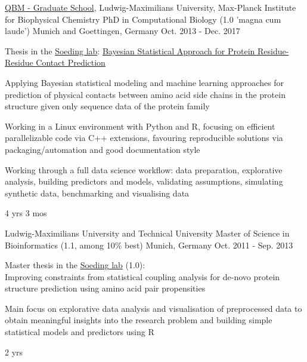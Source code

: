 

\begin{cventries}

  \cventrynew
  	{\href{http://www.qbm.genzentrum.lmu.de/}{QBM - Graduate School}, Ludwig-Maximilians University, Max-Planck Institute for Biophysical Chemistry}
  	{PhD in Computational Biology (1.0 'magna cum laude')} 
	{Munich and Goettingen, Germany}
	{Oct. 2013 - Dec. 2017}
	{
		\begin{cvitems}
			\item {Thesis in the \href{http://www.mpibpc.mpg.de/soeding}{Soeding lab}: \href{https://edoc.ub.uni-muenchen.de/21635/}{Bayesian Statistical Approach for Protein Residue-Residue Contact Prediction} }
			\item {Applying Bayesian statistical modeling and machine learning approaches for prediction of physical contacts between amino acid side chains in the protein structure given only sequence data of the protein family}
			\item {Working in a Linux environment with Python and R, focusing on efficient parallelizable code via C++ extensions, favouring reproducible solutions via packaging/automation and good documentation style}
			\item{Working through a full data science workflow: data preparation, explorative analysis, building predictors and models, validating assumptions, simulating synthetic data, benchmarking and visualising data}
		\end{cvitems}
	}
	{4 yrs 3 mos}

  \cventrynew
  	{Ludwig-Maximilians University and Technical University}
    {Master of Science in Bioinformatics (1.1, among 10\% best)} 
	{Munich, Germany}
	{Oct. 2011 - Sep. 2013}
	{
		\begin{cvitems}
			\item {Master thesis in the \href{http://www.mpibpc.mpg.de/soeding}{Soeding lab} (1.0):\\
			Improving constraints from statistical coupling analysis for de-novo protein structure prediction using amino acid pair propensities}
			\item {Main focus on explorative data analysis and visualisation of preprocessed data to obtain meaningful insights into the research problem and building simple statistical models and predictors using R}
		\end{cvitems}
	}
	{2 yrs}


\end{cventries}
